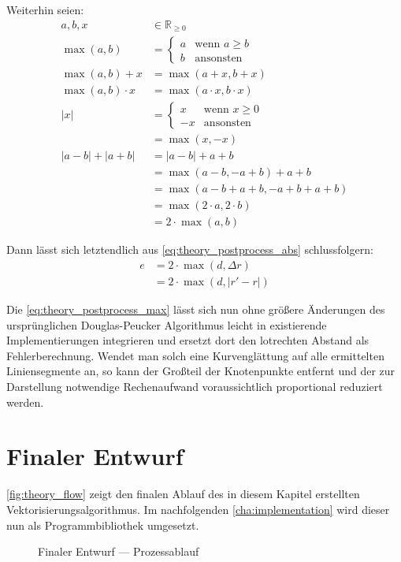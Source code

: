Weiterhin seien:
\begin{align}
    a, b, x &\in ℝ_{≥0} \\[3mm]
    \max(a, b) &= \begin{cases}
        a & \text{wenn } a ≥ b \\
        b & \text{ansonsten}
    \end{cases} \\
    \max(a, b) + x &= \max(a + x, b + x) \\
    \max(a, b) \cdot x &= \max(a \cdot x, b \cdot x) \\[3mm]
    |x| &= \begin{cases}
         x & \text{wenn } x ≥ 0 \\
        -x & \text{ansonsten}
    \end{cases} \\
        &= \max(x, -x) \\[3mm]
    |a - b| + |a + b| &= |a - b| + a + b \\
                      &= \max(a - b, -a + b) + a + b \\
                      &= \max(a - b + a + b, -a + b + a + b) \\
                      &= \max(2 \cdot a, 2 \cdot b) \\
                      &= 2 \cdot \max(a, b)
\end{align}

Dann lässt sich letztendlich aus \autoref{eq:theory_postprocess_abs} schlussfolgern:
\begin{align}
    e &= 2 \cdot \max(d, Δr) \\
    \label{eq:theory_postprocess_max}
      &= 2 \cdot \max(d, |r' - r|)
\end{align}

Die \autoref{eq:theory_postprocess_max} lässt sich nun ohne größere Änderungen des ursprünglichen Douglas-Peucker Algorithmus leicht in existierende Implementierungen integrieren und ersetzt dort den lotrechten Abstand als Fehlerberechnung.
Wendet man solch eine Kurvenglättung auf alle ermittelten Liniensegmente an, so kann der Großteil der Knotenpunkte entfernt und der zur Darstellung notwendige Rechenaufwand voraussichtlich proportional reduziert werden.

\clearpage
\section{Finaler Entwurf}%
\label{sec:theory_flow}

\autoref{fig:theory_flow} zeigt den finalen Ablauf des in diesem Kapitel erstellten Vektorisierungsalgorithmus.
Im nachfolgenden \autoref{cha:implementation} wird dieser nun als Programmbibliothek umgesetzt.

\begin{figure}[htbp]
    \centering
    
    \caption{Finaler Entwurf --- Prozessablauf}%
    \label{fig:theory_flow}
\end{figure}
